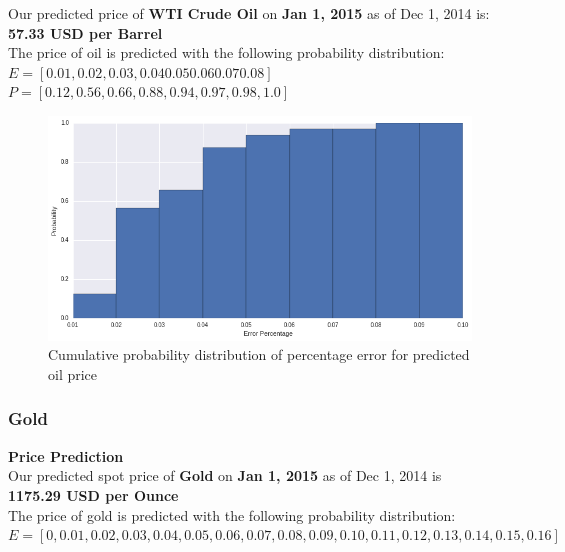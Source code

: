 \documentclass[runningheads]{llncs}
\begin{document}
\noindent Our predicted price of \textbf{WTI Crude Oil} on \textbf{Jan 1, 2015} as of Dec 1, 2014 is: \\
\textbf{57.33 USD per Barrel} \\

\noindent The price of oil is predicted with the following probability distribution: \\

\noindent $E = [0.01, 0.02, 0.03,  0.04  0.05  0.06  0.07  0.08]$ \\

\noindent $P = [0.12, 0.56, 0.66, 0.88, 0.94, 0.97, 0.98, 1.0]$ \\

\begin{figure}
\centering
\includegraphics[width=\textwidth]{predict_oil.png}
\caption{Cumulative probability distribution of percentage error for predicted oil price}
\label{fig:predict_oil.png}
\end{figure}


\subsubsection {Gold} \textbf{Price Prediction}\\

\noindent Our predicted spot price of \textbf{Gold} on \textbf{Jan 1, 2015} as of Dec 1, 2014 is \\
\textbf{1175.29 USD per Ounce} \\

\noindent The price of gold is predicted with the following probability distribution: \\

\noindent $E = [0, 0.01, 0.02, 0.03, 0.04, 0.05, 0.06, 0.07, 0.08, 0.09, 0.10, 0.11, 0.12, 0.13, 0.14, 0.15, 0.16]$ \\
\end{document}

